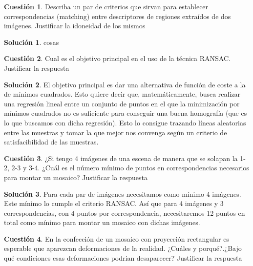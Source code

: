 \documentclass[a4paper, 11pt]{article}
\theoremstyle{definition}
\newtheorem{cuestion}{Cuestión}
\newtheorem*{solucion}{Solución}
\begin{document}
  \begin{cuestion}
    Describa un par de criterios que sirvan para establecer correspondencias
    (matching) entre descriptores de regiones extraídos de dos imágenes. Justificar
    la idoneidad de los mismos
  \end{cuestion}

  \begin{solucion}
     	cosas
  \end{solucion}

  \begin{cuestion}
    Cual es el objetivo principal en el uso de la técnica RANSAC. Justificar
    la respuesta
  \end{cuestion}

  \begin{solucion}
     	El objetivo principal es dar una alternativa de función de coste a la de mínimos
      cuadrados. Esto quiere decir que, matemáticamente, busca realizar una regresión
      lineal entre un conjunto de puntos en el que la minimización por mínimos cuadrados
      no es suficiente para conseguir una buena homografía (que es lo que buscamos con
      dicha regresión). Esto lo consigue trazando líneas aleatorias entre las muestras
      y tomar la que mejor nos convenga según un criterio de satisfacibilidad de las muestras.
  \end{solucion}
  \begin{cuestion}
    ¿Si tengo 4 imágenes de una escena de manera que se solapan la 1-2, 2-3
    y 3-4. ¿Cuál es el número mínimo de puntos en correspondencias necesarios para
    montar un mosaico? Justificar la respuesta
  \end{cuestion}

  \begin{solucion}
     	Para cada par de imágenes necesitamos como mínimo 4 imágenes. Este mínimo lo
      cumple el criterio RANSAC. Así que para 4 imágenes y 3 correspondencias, con
      4 puntos por correspondencia, necesitaremos 12 puntos en total como mínimo
      para montar un mosaico con dichas imágenes.
  \end{solucion}

  \begin{cuestion}
    En la confección de un mosaico con proyección rectangular es esperable
   que aparezcan deformaciones de la realidad. ¿Cuáles y porqué?.¿Bajo qué
   condiciones esas deformaciones podrían desaparecer? Justificar la respuesta

  \end{cuestion}
\end{document}
